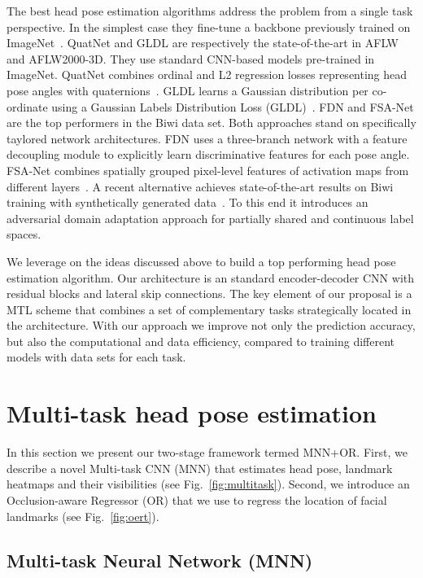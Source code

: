 \documentclass[9pt,technote,compsoc]{IEEEtran}
\begin{document}
The best head pose estimation algorithms address the problem from a single task perspective.
In the simplest case they fine-tune a backbone previously trained on ImageNet~\cite{Amador17,Chang17,Ruiz18}. 
QuatNet and GLDL are respectively the state-of-the-art in AFLW and AFLW2000-3D. They use standard CNN-based models pre-trained in ImageNet. QuatNet combines ordinal and L2 regression losses representing head pose angles with quaternions~\cite{Hsu18}.
GLDL learns a Gaussian distribution per co-ordinate using a Gaussian Labels Distribution Loss (GLDL)~\cite{Liu19b}. 
FDN and FSA-Net are the top performers in the Biwi data set. Both approaches stand on specifically taylored network architectures. FDN uses a three-branch network with a feature decoupling module to explicitly learn discriminative features for each pose angle\cite{Zhang20}. FSA-Net combines spatially grouped pixel-level features of activation  maps from different layers~\cite{Yang19}. A recent alternative achieves state-of-the-art results on Biwi training with synthetically generated data~\cite{Kuhnke19}. To this end it introduces an adversarial domain adaptation approach for partially shared and continuous label spaces.


We leverage on the ideas discussed above to build a top performing head pose estimation algorithm. Our architecture is an standard encoder-decoder CNN with residual blocks and lateral skip connections. The key element of our proposal is a MTL scheme that combines a set of complementary tasks strategically located in the architecture. With our approach we improve not only the prediction accuracy, but also the computational and data efficiency, compared to training different models with data sets for each task.




\section{Multi-task head pose estimation}
\label{sec:algorithm}

In this section we present our two-stage framework termed MNN+OR. First, we describe a novel Multi-task CNN (MNN) that estimates head pose, landmark heatmaps and their visibilities (see Fig.~\ref{fig:multitask}). Second, we introduce an Occlusion-aware Regressor (OR) that we use to regress the location of facial landmarks (see Fig.~\ref{fig:oert}). 

\subsection{Multi-task Neural Network (MNN)}
\label{sec:mnn}
\end{document}
